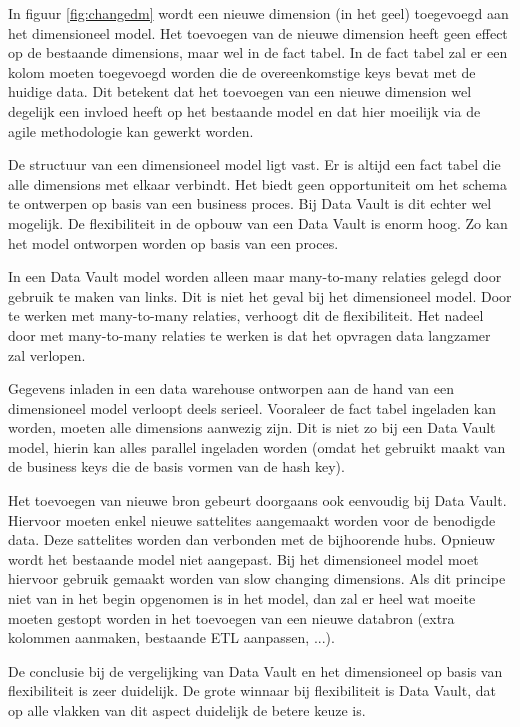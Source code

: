 In figuur \ref{fig:changedm} wordt een nieuwe dimension (in het geel) toegevoegd aan het dimensioneel model. Het toevoegen van de nieuwe dimension heeft geen effect op de bestaande dimensions, maar wel in de fact tabel. In de fact tabel zal er een kolom moeten toegevoegd worden die de overeenkomstige keys bevat met de huidige data. Dit betekent dat het toevoegen van een nieuwe dimension wel degelijk een invloed heeft op het bestaande model en dat hier moeilijk via de agile methodologie kan gewerkt worden.

De structuur van een dimensioneel model ligt vast. Er is altijd een fact tabel die alle dimensions met elkaar verbindt. Het biedt geen opportuniteit om het schema te ontwerpen op basis van een business proces. Bij Data Vault is dit echter wel mogelijk. De flexibiliteit in de opbouw van een Data Vault is enorm hoog. Zo kan het model ontworpen worden op basis van een proces.

In een Data Vault model worden alleen maar many-to-many relaties gelegd door gebruik te maken van links. Dit is niet het geval bij het dimensioneel model. Door te werken met many-to-many relaties, verhoogt dit de flexibiliteit. Het nadeel door met many-to-many relaties te werken is dat het opvragen data langzamer zal verlopen.

Gegevens inladen in een data warehouse ontworpen aan de hand van een dimensioneel model verloopt deels serieel. Vooraleer de fact tabel ingeladen kan worden, moeten alle dimensions aanwezig zijn. Dit is niet zo bij een Data Vault model, hierin kan alles parallel ingeladen worden (omdat het gebruikt maakt van de business keys die de basis vormen van de hash key).

Het toevoegen van nieuwe bron gebeurt doorgaans ook eenvoudig bij Data Vault. Hiervoor moeten enkel nieuwe sattelites aangemaakt worden voor de benodigde data. Deze sattelites worden dan verbonden met de bijhoorende hubs. Opnieuw wordt het bestaande model niet aangepast. Bij het dimensioneel model moet hiervoor gebruik gemaakt worden van slow changing dimensions. Als dit principe niet van in het begin opgenomen is in het model, dan zal er heel wat moeite moeten gestopt worden in het toevoegen van een nieuwe databron (extra kolommen aanmaken, bestaande ETL aanpassen, ...).

De conclusie bij de vergelijking van Data Vault en het dimensioneel op basis van flexibiliteit is zeer duidelijk. De grote winnaar bij flexibiliteit is Data Vault, dat op alle vlakken van dit aspect duidelijk de betere keuze is.

